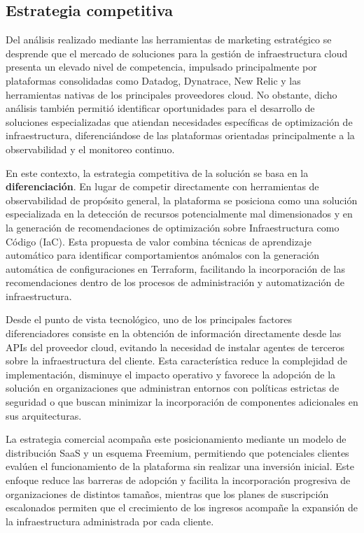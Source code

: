 \subsection{Estrategia competitiva}

Del análisis realizado mediante las herramientas de marketing estratégico se desprende que el mercado de soluciones para la gestión de infraestructura cloud presenta un elevado nivel de competencia, impulsado principalmente por plataformas consolidadas como Datadog, Dynatrace, New Relic y las herramientas nativas de los principales proveedores cloud. No obstante, dicho análisis también permitió identificar oportunidades para el desarrollo de soluciones especializadas que atiendan necesidades específicas de optimización de infraestructura, diferenciándose de las plataformas orientadas principalmente a la observabilidad y el monitoreo continuo.

En este contexto, la estrategia competitiva de la solución se basa en la \textbf{diferenciación}. En lugar de competir directamente con herramientas de observabilidad de propósito general, la plataforma se posiciona como una solución especializada en la detección de recursos potencialmente mal dimensionados y en la generación de recomendaciones de optimización sobre Infraestructura como Código (IaC). Esta propuesta de valor combina técnicas de aprendizaje automático para identificar comportamientos anómalos con la generación automática de configuraciones en Terraform, facilitando la incorporación de las recomendaciones dentro de los procesos de administración y automatización de infraestructura.

Desde el punto de vista tecnológico, uno de los principales factores diferenciadores consiste en la obtención de información directamente desde las APIs del proveedor cloud, evitando la necesidad de instalar agentes de terceros sobre la infraestructura del cliente. Esta característica reduce la complejidad de implementación, disminuye el impacto operativo y favorece la adopción de la solución en organizaciones que administran entornos con políticas estrictas de seguridad o que buscan minimizar la incorporación de componentes adicionales en sus arquitecturas.

La estrategia comercial acompaña este posicionamiento mediante un modelo de distribución SaaS y un esquema Freemium, permitiendo que potenciales clientes evalúen el funcionamiento de la plataforma sin realizar una inversión inicial. Este enfoque reduce las barreras de adopción y facilita la incorporación progresiva de organizaciones de distintos tamaños, mientras que los planes de suscripción escalonados permiten que el crecimiento de los ingresos acompañe la expansión de la infraestructura administrada por cada cliente.

